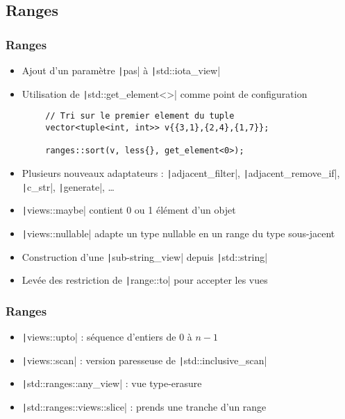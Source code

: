 \documentclass[C++.tex]{subfiles}
\begin{document}
\subsection*{Ranges}
\begin{frame}[fragile]
	\frametitle{Ranges}
	\begin{itemize}
		\item Ajout d'un paramètre \texttt|pas| à \texttt|std::iota_view|
		\item Utilisation de \texttt|std::get_element<>| comme point de configuration
	\end{itemize}

	\begin{verbatim}
		// Tri sur le premier element du tuple
		vector<tuple<int, int>> v{{3,1},{2,4},{1,7}};

		ranges::sort(v, less{}, get_element<0>);
	\end{verbatim}

	\begin{itemize}
		\item Plusieurs nouveaux adaptateurs : \texttt|adjacent_filter|, \texttt|adjacent_remove_if|, \texttt|c_str|, \texttt|generate|, \ldots
		\item \texttt|views::maybe| contient 0 ou 1 élément d'un objet
		\item \texttt|views::nullable| adapte un type nullable en un range du type sous-jacent
		\item Construction d'une \texttt|sub-string_view| depuis \texttt|std::string|
		\item Levée des restriction de \texttt|range::to| pour accepter les vues
	\end{itemize}

\end{frame}

\begin{frame}[fragile]
	\frametitle{Ranges}
	\begin{itemize}
		\item \texttt|views::upto| : séquence d'entiers de 0 à $n - 1$
		\item \texttt|views::scan| : version paresseuse de \texttt|std::inclusive_scan|
		\item \texttt|std::ranges::any_view| : vue \og{}type-erasure\fg{}
		\item \texttt|std::ranges::views::slice| : prends une tranche d'un range
	\end{itemize}

\end{frame}
\end{document}

